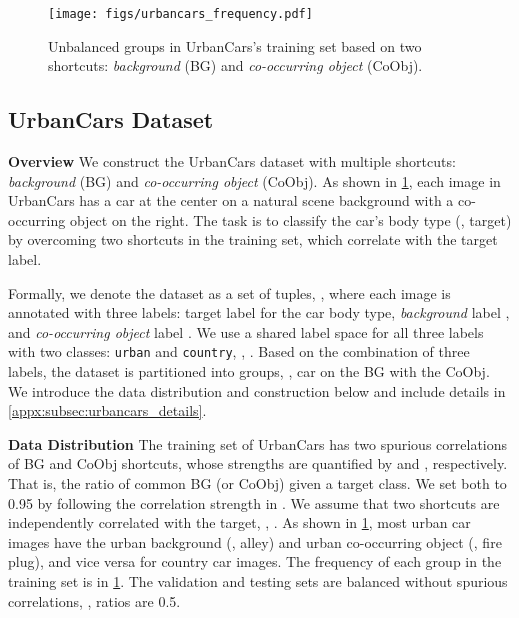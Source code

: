 \documentclass[10pt,twocolumn,letterpaper]{article}
\begin{document}
\begin{figure}[!b]
  \vspace{-6mm}
  \centering
  \texttt{[image: figs/urbancars\_frequency.pdf]}
  \caption{Unbalanced groups in UrbanCars's training set based on two shortcuts: \textit{background} (BG) and \textit{co-occurring object} (CoObj).}
   \label{fig:urbancars_details}
\end{figure}

\subsection{UrbanCars Dataset}
\label{subsec:urbancars}

\noindent \textbf{Overview} \quad We construct the UrbanCars dataset with multiple shortcuts: \textit{background} (BG) and \textit{co-occurring object} (CoObj). As shown in \cref{fig:urbancars_details}, each image in UrbanCars has a car at the center on a natural scene background with a co-occurring object on the right. The task is to classify the car's body type (\ie, target) by overcoming two shortcuts in the training set, which correlate with the target label.

Formally, we denote the dataset as a set of  tuples, , where each image  is annotated with three labels: target label  for the car body type, \textit{background} label , and \textit{co-occurring object} label . We use a shared label space for all three labels with two classes: \texttt{urban} and \texttt{country}, \ie, . Based on the combination of three labels, the dataset is partitioned into  groups, \ie,  car on the  BG with the  CoObj. We introduce the data distribution and construction below and include details in \cref{appx:subsec:urbancars_details}.

\noindent \textbf{Data Distribution} \quad The training set of UrbanCars has two spurious correlations of BG and CoObj shortcuts, whose strengths are quantified by  and , respectively. That is, the ratio of common BG (or CoObj) given a target class. We set both to 0.95 by following the correlation strength in \cite{sagawa2020Int.Conf.Learn.Represent.Distributionally}. We assume that two shortcuts are independently correlated with the target, \ie, .
As shown in \cref{fig:urbancars_details}, most urban car images have the urban background (\eg, alley) and urban co-occurring object (\eg, fire plug), and vice versa for country car images. The frequency of each group in the training set is in \cref{fig:urbancars_details}. The validation and testing sets are balanced without spurious correlations, \ie, ratios are 0.5.
\end{document}

